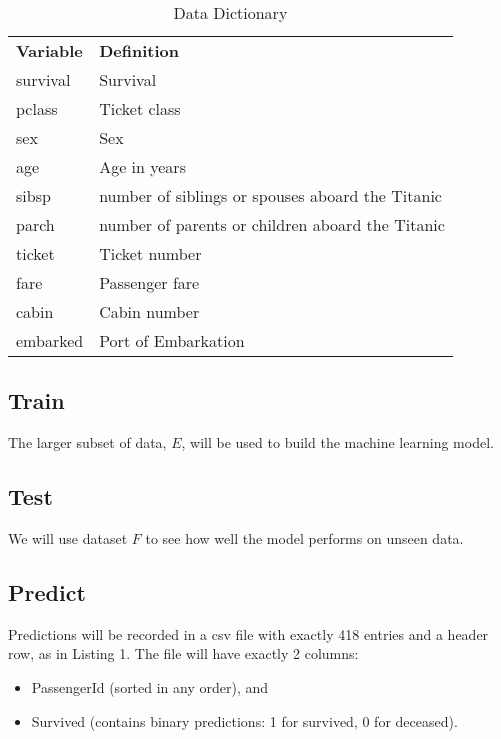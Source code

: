 \documentclass[12pt]{amsproc}
\theoremstyle{definition}
\begin{document}
	\begin{table}[h]
		\centering
		\caption{Data Dictionary}
		\label{table:data dictionary}
		\begin{tabular}{ll}
			\textbf{Variable} & \textbf{Definition} \\
			survival & Survival \\
			pclass & Ticket class \\
			sex & Sex \\
			age & Age in years \\
			sibsp & number of siblings or spouses aboard the Titanic \\
			parch & number of parents or children aboard the Titanic \\
			ticket & Ticket number \\
			fare & Passenger fare \\
			cabin & Cabin number \\
			embarked & Port of Embarkation
		\end{tabular}
	\end{table}
	
	
	\subsection{Train}\label{method:train}
	The larger subset of data, $E$, will be used to build the machine learning model.
	
	\subsection{Test}\label{method:test}
	We will use dataset $F$ to see how well the model performs on unseen data. 
	
	\subsection{Predict}\label{method:predict}
	

	Predictions will be recorded in a csv file with exactly 418 entries and a header row, as in Listing 1. The file will have exactly 2 columns:
	\begin{itemize}
		\item PassengerId (sorted in any order), and
		\item Survived (contains binary predictions: 1 for survived, 0 for deceased).
	\end{itemize}
	
\end{document}
